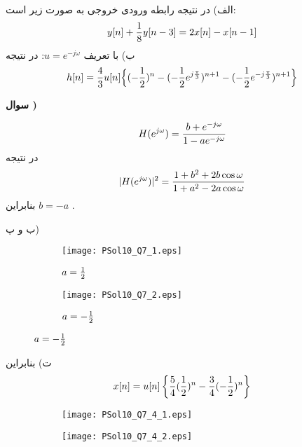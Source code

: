 \documentclass[10pt,letterpaper]{article}
\newcounter{QuestionNumber}
\newcommand{\Q}{
\textbf{
سوال \theQuestionNumber)
}
\stepcounter{QuestionNumber}
}
\begin{document}
الف) 
در نتیجه رابطه ورودی خروجی به صورت زیر است:
$$
y[n]+{1\over 8}y[n-3]=2x[n]-x[n-1]
$$
ب) با تعریف 
$
u=e^{-j\omega}
$:
در نتیجه
$$
h[n]={4\over 3}u[n]\Big\{
(-{1\over 2})^n-(-{1\over 2}e^{j{\pi\over 3}})^{n+1}-(-{1\over 2}e^{-j{\pi\over 3}})^{n+1}
\Big\}
$$
\Q

$$
H(e^{j\omega})={b+e^{-j\omega}\over 1-ae^{-j\omega}}
$$
در نتیجه
$$
|H(e^{j\omega})|^2={1+b^2+2b\cos\omega\over 1+a^2-2a\cos\omega}
$$
بنابراین 
$
b=-a
$
.

ب و پ)
\begin{figure}[h!]
\centering
\begin{subfigure}{0.49\textwidth}
\texttt{[image: PSol10\_Q7\_1.eps]}
\caption{$a={1\over 2}$}
\end{subfigure}
\begin{subfigure}{0.49\textwidth}
\texttt{[image: PSol10\_Q7\_2.eps]}
\caption{$a=-{1\over 2}$}
\end{subfigure}
\end{figure}

ت)
بنابراین
$$
x[n]=u[n]\left\{{5\over 4}({1\over 2})^n-{3\over 4}(-{1\over 2})^n\right\}
$$
\begin{figure}[h!]
\centering
\begin{subfigure}{0.49\textwidth}
\texttt{[image: PSol10\_Q7\_4\_1.eps]}
\end{subfigure}
\begin{subfigure}{0.49\textwidth}
\texttt{[image: PSol10\_Q7\_4\_2.eps]}
\end{subfigure}
\end{figure}
\end{document}
